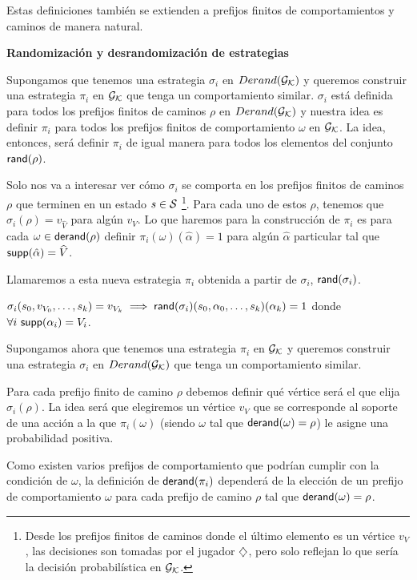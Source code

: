 Estas definiciones también se extienden a prefijos finitos de comportamientos y
caminos de manera natural.

\textbf{Randomización y desrandomización de estrategias}

Supongamos que tenemos una estrategia $\sigma_i$ en $Derand(\mathcal{G}_{\mathcal{K}})$ y queremos construir
una estrategia $\pi_i$ en $\mathcal{G}_{\mathcal{K}}$ que tenga un comportamiento similar. $\sigma_i$
está definida para todos los prefijos finitos de caminos $\rho$ en $Derand(\mathcal{G}_{\mathcal{K}})$ y
nuestra idea es definir $\pi_i$ para todos los prefijos finitos de
comportamiento $\omega$ en $\mathcal{G}_{\mathcal{K}}$. La idea, entonces, será definir $\pi_i$ de
igual manera para todos los elementos del conjunto $\textsf{rand}(\rho)$.

Solo nos va a interesar ver cómo $\sigma_i$ se comporta en los prefijos finitos
de caminos $\rho$ que terminen en un estado $s \in \mathcal{S}$ \footnote{Desde los
	prefijos finitos de caminos donde el último elemento es un vértice $v_V$, las
	decisiones son tomadas por el jugador $\diamondsuit$, pero solo reflejan lo que sería
	la decisión probabilística en $\mathcal{G}_{\mathcal{K}}$.}. Para cada uno de estos $\rho$, tenemos
que $\sigma_i(\rho) = v_{\widehat{V}}$ para algún $v_V$. Lo que haremos para la
construcción de $\pi_i$ es para cada $\omega \in \textsf{derand}(\rho)$ definir
$\pi_i(\omega)(\hat\alpha) = 1$ para algún $\hat\alpha$ particular tal que
$\textsf{supp}(\hat\alpha) = \widehat{V}$.

Llamaremos a esta nueva estrategia $\pi_i$ obtenida a partir de $\sigma_i$,
$\textsf{rand}(\sigma_i)$.

\begin{center}
	$\sigma_i(s_0, v_{V_0}, \dots, s_k) = v_{V_k} \implies \textsf{rand}(\sigma_i)(s_0, \alpha_0, \dots, s_k)(\alpha_k) = 1$ donde \\ $\forall i \ \textsf{supp}(\alpha_i) = V_i$.
\end{center}

Supongamos ahora que tenemos una estrategia $\pi_i$ en $\mathcal{G}_{\mathcal{K}}$ y queremos
construir una estrategia $\sigma_i$ en $Derand(\mathcal{G}_{\mathcal{K}})$ que tenga un comportamiento
similar.

Para cada prefijo finito de camino $\rho$ debemos definir qué vértice será el
que elija $\sigma_i(\rho)$. La idea será que elegiremos un vértice $v_V$ que se
corresponde al soporte de una acción a la que $\pi_i(\omega)$ (siendo $\omega$
tal que $\textsf{derand}(\omega) = \rho$) le asigne una probabilidad positiva.

Como existen varios prefijos de comportamiento que podrían cumplir con la
condición de $\omega$, la definición de $\textsf{derand}(\pi_i)$ dependerá de la
elección de un prefijo de comportamiento $\omega$ para cada prefijo de camino
$\rho$ tal que $\textsf{derand}(\omega) = \rho$.

